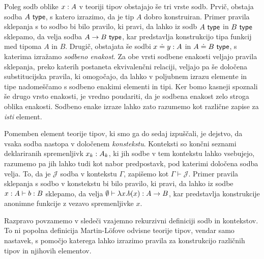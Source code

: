 Poleg sodb oblike \(x : A\) v teoriji tipov obstajajo še tri vrste sodb.
Prvič, obstaja sodba \(A\ \textnormal{\textsf{type}}\), s katero izrazimo, da je tip \(A\) dobro konstruiran.
Primer pravila sklepanja s to sodbo bi bilo
pravilo, ki pravi, da lahko iz sodb \(A\ \textnormal{\textsf{type}}\) in \(B\ \textnormal{\textsf{type}}\) sklepamo, da velja
sodba \(A \to B\ \textnormal{\textsf{type}}\), kar predstavlja konstrukcijo tipa funkcij
med tipoma \(A\) in \(B\).
Drugič, obstajata še sodbi \(x \doteq y : A\) in \(A \doteq B\ \textnormal{\textsf{type}}\),
s katerima izražamo \emph{sodbeno enakost}. Za obe vrsti sodbene enakosti veljajo pravila
sklepanja, preko katerih postaneta ekvivalenčni relaciji,
veljajo pa še določena substitucijska
pravila, ki omogočajo, da lahko v poljubnem izrazu elemente in tipe nadomeščamo s sodbeno
enakimi elementi in tipi. Ker bomo kasneji spoznali še drugo vrsto enakosti, je vredno
poudariti, da je sodbena enakost zelo stroga oblika enakosti. Sodbeno enake izraze lahko
zato razumemo kot različne zapise za \emph{isti} element.

Pomemben element teorije tipov, ki smo ga do sedaj izpuščali, je dejstvo,
da vsaka sodba nastopa v določenem \emph{konstekstu}. Konteksti so končni seznami
deklariranih spremenljivk \(x_k : A_{k}\), ki jih sodbe v tem kontekstu
lahko vsebujejo, razumemo pa jih lahko tudi kot nabor predpostavk, pod katerimi določena
sodba velja.  To, da je \(\mathcal{J}\) sodba v kontekstu \(\Gamma\), zapišemo kot \(\Gamma \vdash \mathcal{J}\).
Primer pravila sklepanja s sodbo v konstekstu bi bilo pravilo, ki pravi,
da lahko iz sodbe
\(x : A \vdash b : B\) sklepamo, da velja
\(\emptyset \vdash \lambda x.b(x) : A \to B\), kar predstavlja konstrukcije
anonimne funkcije z vezavo spremenljivke \(x\).

Razpravo povzamemo v sledeči vzajemno rekurzivni definiciji sodb in kontekstov. To ni popolna definicija Martin-Löfove odvisne teorije tipov, vendar samo nastavek, s pomočjo katerega lahko izrazimo pravila za konstrukcijo različnih tipov in njihovih elementov.

